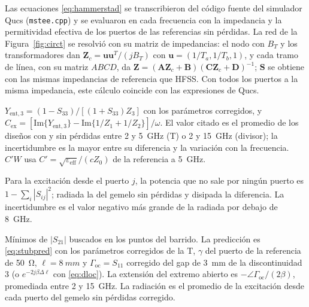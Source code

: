 \documentclass[11pt,letterpaper]{article}
\begin{document}
\begin{description}[style=nextline,leftmargin=0pt,itemsep=4pt,font=\normalfont\bfseries]
\item[Modelo de Hammerstad] Las ecuaciones \eqref{eq:hammerstad} se transcribieron del código fuente del simulador Qucs (\texttt{mstee.cpp}) y se evaluaron en cada frecuencia con la impedancia y la permitividad efectiva de los puertos de las referencias sin pérdidas. La red de la Figura~\ref{fig:circt} se resolvió con su matriz de impedancias: el nodo con $B_T$ y los transformadores dan $\mathbf{Z}_c=\mathbf{u}\mathbf{u}^T/(jB_T)$ con $\mathbf{u}=(1/T_a,1/T_b,1)$, y cada tramo de línea, con su matriz $ABCD$, da $\mathbf{Z}=(\mathbf{A}\mathbf{Z}_c+\mathbf{B})(\mathbf{C}\mathbf{Z}_c+\mathbf{D})^{-1}$; $\mathbf{S}$ se obtiene con las mismas impedancias de referencia que HFSS. Con todos los puertos a la misma impedancia, este cálculo coincide con las expresiones de Qucs.

\item[Figura~\ref{fig:d5div} y Tabla~\ref{tab:d5div} (divisor y capacitancia en exceso)] $Y_{\mathrm{ent},3}=(1-S_{33})/[(1+S_{33})Z_3]$ con los parámetros corregidos, y $C_{\mathrm{ex}}=[\mathrm{Im}\{Y_{\mathrm{ent},3}\}-\mathrm{Im}\{1/Z_1+1/Z_2\}]/\omega$. El valor citado es el promedio de los diseños con y sin pérdidas entre 2 y \SI{5}{GHz} (T) o 2 y \SI{15}{GHz} (divisor); la incertidumbre es la mayor entre su diferencia y la variación con la frecuencia. $C'W$ usa $C'=\sqrt{\varepsilon_{\mathrm{eff}}}/(cZ_0)$ de la referencia a \SI{5}{GHz}.

\item[Tabla~\ref{tab:d5pot} (potencia en la T)] Para la excitación desde el puerto $j$, la potencia que no sale por ningún puerto es $1-\sum_i|S_{ij}|^2$; radiada la del gemelo sin pérdidas y disipada la diferencia. La incertidumbre es el valor negativo más grande de la radiada por debajo de \SI{8}{GHz}.

\item[Figura~\ref{fig:d5stub} (stub)] Mínimos de $|S_{21}|$ buscados en los puntos del barrido. La predicción es \eqref{eq:stubpred} con los parámetros corregidos de la T, $\gamma$ del puerto de la referencia de \SI{50}{\ohm}, $\ell=\SI{8}{mm}$ y $\Gamma_{\mathrm{oc}}=S_{11}$ corregido del gap de \SI{3}{mm} de la discontinuidad 3 (o $e^{-2j\beta\Delta\ell}$ con \eqref{eq:dloc}). La extensión del extremo abierto es $-\angle\Gamma_{\mathrm{oc}}/(2\beta)$, promediada entre 2 y \SI{15}{GHz}. La radiación es el promedio de la excitación desde cada puerto del gemelo sin pérdidas corregido.


\end{description}
\end{document}
